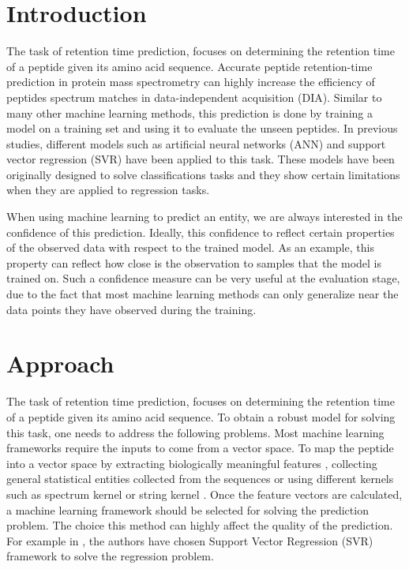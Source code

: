 \documentclass{bioinfo}
\begin{document}
\section{Introduction}
The task of retention time prediction, focuses on determining the retention time of a peptide given its amino acid sequence. Accurate peptide retention-time prediction in protein mass spectrometry can highly increase the efficiency of peptides spectrum matches in data-independent acquisition (DIA). Similar to many other machine learning methods, this prediction is done by training a model on a training set and using it to evaluate the unseen peptides. In previous studies, different models such as artificial neural networks (ANN) \cite{?} and support vector regression \cite{?} (SVR) have been applied to this task. These models have been originally designed to solve classifications tasks and they show certain limitations when they are applied to regression tasks.

When using machine learning to predict an entity, we are always interested in the confidence of this prediction. Ideally, this confidence to reflect certain properties of the observed data with respect to the trained model. As an example, this property can reflect how close is the observation to samples that the model is trained on. Such a confidence measure can be very useful at the evaluation stage, due to the fact that most machine learning methods can only generalize near the data points they have observed during the training.  

\section{Approach}
The task of retention time prediction, focuses on determining the retention time of a peptide given its amino acid sequence. To obtain a robust model for solving this task, one needs to address the following problems. Most machine learning frameworks require the inputs to come from a vector space. To map the peptide into a vector space by extracting biologically meaningful features \cite{elute}, collecting general statistical entities collected from the sequences \cite{Rieck:2011ed} or using different kernels such as spectrum kernel \cite{Leslie:2002tx} or string kernel \cite{Lodhi:2002ts}. Once the feature vectors are calculated, a machine learning framework should be selected for solving the prediction problem. The choice this method can highly affect the quality of the prediction. For example in \cite{elute}, the authors have chosen Support Vector Regression (SVR) framework \cite{Bishop:2006ui} to solve the regression problem.
\end{document}
